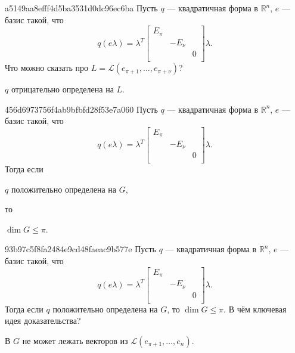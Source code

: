 \begin{note}{a5149aa8efff4d5ba3531d0dc96ec6ba}
    Пусть \({ q }\) --- квадратичная форма в \({ \mathbb R^{n} }\),
    \({ e }\) --- базис такой, что
    \[
        q(e\lambda) = \lambda^{T} \begin{bmatrix}
            E_{\pi}   \\
            & -E_{\nu} \\
            && 0      \\
        \end{bmatrix}
        \lambda.
    \]
    Что можно сказать про \({ L = \mathscr L (e_{\pi + 1}, \ldots, e_{\pi + \nu}) }\)?

    \begin{cloze}{1}
        \({ q }\) отрицательно определена на \({ L }\).
    \end{cloze}
\end{note}

\begin{note}{456d6973756f4ab9bfbfd28f53e7a060}
    Пусть \({ q }\) --- квадратичная форма в \({ \mathbb R^{n} }\),
    \({ e }\) --- базис такой, что
    \[
        q(e\lambda) = \lambda^{T} \begin{bmatrix}
            E_{\pi}   \\
            & -E_{\nu} \\
            && 0      \\
        \end{bmatrix}
        \lambda.
    \]
    Тогда если \begin{icloze}{2}\({ q }\) положительно определена на \({ G }\),\end{icloze} то \begin{icloze}{1}\({ \dim G \leqslant \pi }\).\end{icloze}
\end{note}

\begin{note}{93b97c5f8fa2484e9cd48faeac9b577e}
    Пусть \({ q }\) --- квадратичная форма в \({ \mathbb R^{n} }\),
    \({ e }\) --- базис такой, что
    \[
        q(e\lambda) = \lambda^{T} \begin{bmatrix}
            E_{\pi}   \\
            & -E_{\nu} \\
            && 0      \\
        \end{bmatrix}
        \lambda.
    \]
    Тогда если \({ q }\) положительно определена на \({ G }\), то \({ \dim G \leqslant \pi }\).
    В чём ключевая идея доказательства?

    \begin{cloze}{1}
        В \({ G }\) не может лежать векторов из \({ \mathscr L (e_{\pi + 1}, \ldots, e_n) }\).
    \end{cloze}
\end{note}

